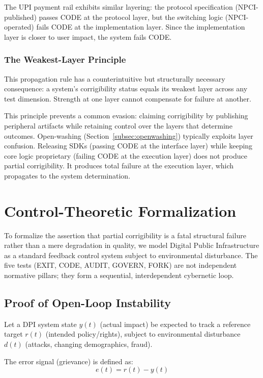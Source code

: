 The UPI payment rail exhibits similar layering: the protocol specification (NPCI-published) passes CODE at the protocol layer, but the switching logic (NPCI-operated) fails CODE at the implementation layer. Since the implementation layer is closer to user impact, the system fails CODE.

\subsubsection{The Weakest-Layer Principle}

This propagation rule has a counterintuitive but structurally necessary consequence: a system's corrigibility status equals its weakest layer across any test dimension. Strength at one layer cannot compensate for failure at another.

This principle prevents a common evasion: claiming corrigibility by publishing peripheral artifacts while retaining control over the layers that determine outcomes. Open-washing (Section~\ref{subsec:openwashing}) typically exploits layer confusion. Releasing SDKs (passing CODE at the interface layer) while keeping core logic proprietary (failing CODE at the execution layer) does not produce partial corrigibility. It produces total failure at the execution layer, which propagates to the system determination.

\section{Control-Theoretic Formalization}
\label{sec:formalization}

To formalize the assertion that partial corrigibility is a fatal structural failure rather than a mere degradation in quality, we model Digital Public Infrastructure as a standard feedback control system subject to environmental disturbance. The five tests (EXIT, CODE, AUDIT, GOVERN, FORK) are not independent normative pillars; they form a sequential, interdependent cybernetic loop.

\subsection{Proof of Open-Loop Instability}

Let a DPI system state $y(t)$ (actual impact) be expected to track a reference target $r(t)$ (intended policy/rights), subject to environmental disturbance $d(t)$ (attacks, changing demographics, fraud).

The error signal (grievance) is defined as:
\begin{equation}
e(t) = r(t) - y(t)
\end{equation}

